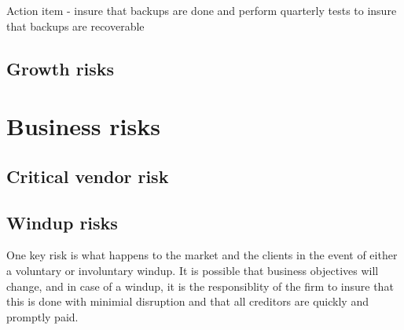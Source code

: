 Action item - insure that backups are done and perform quarterly tests
to insure that backups are recoverable

\subsection{Growth risks}

\section{Business risks}
\subsection{Critical vendor risk}
\subsection{Windup risks}

One key risk is what happens to the market and the clients in the
event of either a voluntary or involuntary windup.  It is possible
that business objectives will change, and in case of a windup, it is
the responsiblity of the firm to insure that this is done with
minimial disruption and that all creditors are quickly and promptly
paid.
